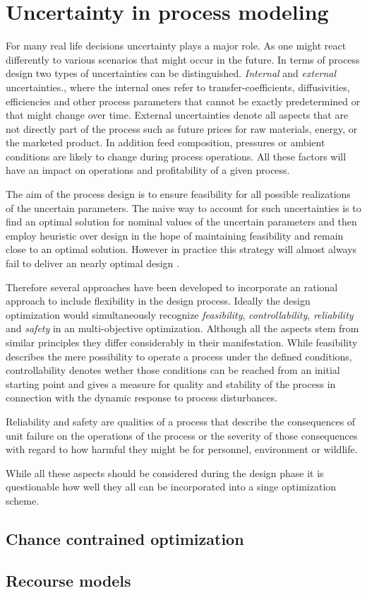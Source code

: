\chapter{Uncertainty in process modeling}
\label{chp:uncertainty}
For many real life decisions uncertainty plays a major role. As one might react differently to various 
scenarios that might occur in the future. In terms of process design two types of uncertainties can be 
distinguished. \emph{Internal} and \emph{external} uncertainties., where the internal ones refer to 
transfer-coefficients, diffusivities, efficiencies and other process parameters that cannot be exactly 
predetermined or that might change over time. External uncertainties denote all aspects that are not directly 
part of the process such as future prices for raw materials, energy, or the marketed product. In addition 
feed composition, pressures or ambient conditions are likely to change during process operations. 
All these factors will have an impact on operations and profitability of a given process. 

The aim of the process design is to ensure feasibility for all possible realizations of the uncertain 
parameters. The naive way to account for such uncertainties is to find an optimal solution for nominal 
values of the uncertain parameters and then employ heuristic over design in the hope of maintaining 
feasibility and remain close to an optimal solution. However in practice this strategy will almost always 
fail to deliver an nearly optimal design \cite{Halemane.1983}. 

Therefore several approaches have been developed to incorporate an rational approach to include
flexibility in the design process. Ideally the design optimization would simultaneously recognize 
\emph{feasibility}, \emph{controllability}, \emph{reliability} and \emph{safety} in an multi-objective
optimization. Although all the aspects stem from similar principles they differ considerably in their 
manifestation. While feasibility describes the mere possibility to operate a process under the defined
conditions, controllability denotes wether those conditions can be reached from an initial starting point 
and gives a measure for quality and stability of the process in connection with the dynamic response to 
process disturbances. 

Reliability and safety are qualities of a process that describe the consequences of unit failure on 
the operations of the process or the severity of those consequences with regard to how harmful they 
might be for personnel, environment or wildlife. 

While all these aspects should be considered during the design phase it is questionable how well
they all can be incorporated into a singe optimization scheme. 

\section{Chance contrained optimization}

\section{Recourse models}


